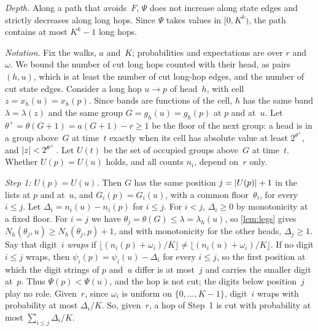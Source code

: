 \begin{informalproof}
\emph{Depth.} Along a path that avoids~$F$, $\Psi$ does not increase along state edges and strictly decreases along
long hops. Since $\Psi$ takes values in $[0,K^k)$, the path contains at most $K^k-1$ long hops.

\emph{Notation.} Fix the walks, $a$ and~$K$; probabilities and expectations are over $r$ and~$\omega$. We bound the
number of cut long hops counted with their head, as pairs $(h,u)$, which is at least the number of cut long-hop
edges, and the number of cut state edges. Consider a long hop $u\to p$ of head~$h$, with cell $z=x_h(u)=x_h(p)$.
Since bands are functions of the cell, $h$ has the same band $\lambda=\lambda(z)$ and the same group
$G=g_h(u)=g_h(p)$ at $p$ and at~$u$. Let $\theta^+=\theta(G+1)=a(G+1)-r\ge1$ be the floor of the next group: a head
is in a group above~$G$ at time~$t$ exactly when its cell has absolute value at least $2^{\theta^+}$, and
$\lvert z \rvert<2^{\theta^+}$. Let $U(t)$ be the set of occupied groups above~$G$ at time~$t$. Whether $U(p)=U(u)$ holds,
and all counts $n_i$, depend on~$r$ only.

\emph{Step 1: $U(p)=U(u)$.} Then $G$ has the same position $j=\lvert U(p) \rvert+1$ in the lists at $p$ and at~$u$, and
$G_i(p)=G_i(u)$, with a common floor~$\theta_i$, for every $i\le j$. Let $\Delta_i=n_i(u)-n_i(p)$ for $i\le j$. For
$i<j$, $\Delta_i\ge0$ by monotonicity at a fixed floor. For $i=j$ we have $\theta_j=\theta(G)\le\lambda=\lambda_h(u)$,
so \cref{lem:legs} gives $N_h(\theta_j,u)\ge N_h(\theta_j,p)+1$, and with monotonicity for the other heads, $\Delta_j\ge1$.
Say that digit~$i$ \emph{wraps} if $\lfloor(n_i(p)+\omega_i)/K\rfloor\ne\lfloor(n_i(u)+\omega_i)/K\rfloor$. If no
digit $i\le j$ wraps, then $\psi_i(p)=\psi_i(u)-\Delta_i$ for every $i\le j$, so the first position at which the
digit strings of $p$ and~$u$ differ is at most~$j$ and carries the smaller digit at~$p$. Thus $\Psi(p)<\Psi(u)$, and
the hop is not cut; the digits below position~$j$ play no role. Given~$r$, since $\omega_i$ is uniform on
$\{0,\dots,K-1\}$, digit~$i$ wraps with probability at most $\Delta_i/K$. So, given~$r$, a hop of Step~1 is cut with
probability at most $\sum_{i\le j}\Delta_i/K$.


\end{informalproof}
